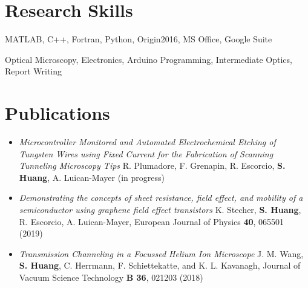 \documentclass[letterpaper, 11pt]{article}
\begin{document}
\section*{Research Skills}
\begin{description}
\setlength\itemsep{0.0000005em}
\item[Analysis:]
MATLAB, C++, Fortran, Python, Origin2016, MS Office, Google Suite
\item[Research:]
Optical Microscopy, Electronics, Arduino Programming, Intermediate Optics, Report Writing
\end{description}

\section*{Publications}

\begin{itemize}

\item

\textit{Microcontroller Monitored and Automated Electrochemical Etching of
Tungsten Wires using Fixed Current for the Fabrication of Scanning
Tunneling Microscopy Tips} R. Plumadore, F. Grenapin, R. Escorcio, \textbf{S. Huang},  A. Luican-Mayer (in progress) 

\item

\textit{Demonstrating the concepts of sheet resistance, field effect, and mobility of a semiconductor using graphene field effect transistors} K. Stecher, \textbf{S. Huang}, R. Escorcio, A. Luican-Mayer, European Journal of Physics \textbf{40}, 065501 (2019) 

\item 
\textit{Transmission Channeling in a Focussed Helium Ion Microscope} J. M. Wang, \textbf{S. Huang},
C. Herrmann,
F. Schiettekatte,
and K. L. Kavanagh, Journal of Vacuum Science  Technology \textbf{B 36}, 021203 (2018) 

\end{itemize}
\end{document}
